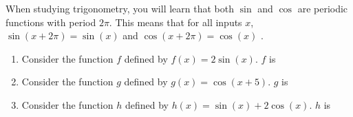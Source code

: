 \documentclass{ximera}
\author{Kenneth Berglund}
\begin{document}
\begin{exercise}
When studying trigonometry, you will learn that both $\sin$ and $\cos$ are periodic functions with period $2\pi$. This means that for all inputs $x$, $\sin(x + 2\pi) = \sin(x)$ and $\cos(x + 2\pi) = \cos(x)$ . 

\begin{enumerate}
\item Consider the function $f$ defined by $f(x) = 2\sin(x)$. $f$ is
\begin{multipleChoice}
\end{multipleChoice}

\item Consider the function $g$ defined by $g(x) = \cos(x + 5)$. $g$ is
\begin{multipleChoice}
\end{multipleChoice}

\item Consider the function $h$ defined by $h(x) = \sin(x) + 2\cos(x)$. $h$ is
\begin{multipleChoice}
\end{multipleChoice}
\end{enumerate}

\end{exercise}
\end{document}
